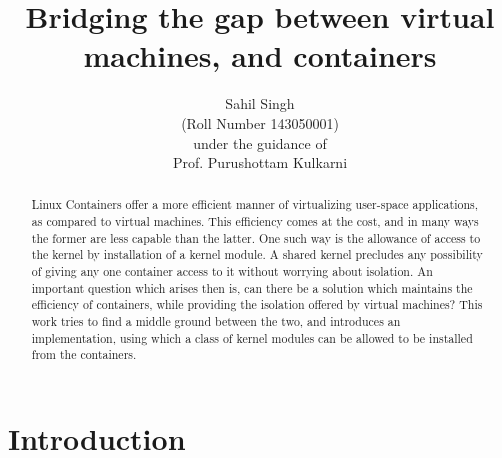 \documentclass[twoside]{iitbreport}
\title{Bridging the gap between virtual machines, and containers}
\author{Sahil Singh\\ (Roll Number 143050001) \\ {\normalfont under the guidance of} \\ Prof. Purushottam Kulkarni}
\begin{document}
 \let\cleardoublepage\clearpage
\maketitle

\begin{abstract}\thispagestyle{empty}
Linux Containers offer a more efficient manner of virtualizing user-space applications, as compared to virtual machines. This efficiency comes at the cost, and in many ways the former are less capable than the latter. One such way is the allowance of access to the kernel by installation of a kernel module. A shared kernel precludes any possibility of giving any one container access to it without worrying about isolation. An important question which arises then is, can there be a solution which maintains the efficiency of containers, while providing the isolation offered by virtual machines? This work tries to find a middle ground between the two, and introduces an implementation, using which a class of kernel modules can be allowed to be installed from the containers.
\end{abstract}
\newpage
\tableofcontents
\newpage
\let\LaTeXStandardClearpage\clearpage
\let\clearpage\relax
\listoftables
\listoffigures
\let\clearpage\LaTeXStandardClearpage
\newpage
\chapter{Introduction}

\end{document}
